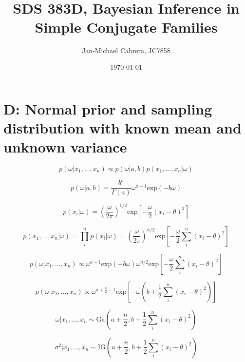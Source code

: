 \documentclass[12pt]{article}
\begin{document}
    \title{SDS 383D, Bayesian Inference in Simple Conjugate Families}
    \author{Jan-Michael Cabrera, JC7858}
    \date{\today}
    \maketitle

    \section*{D: Normal prior and sampling distribution with known mean and unknown variance}

        \begin{equation}
              p(\omega|x_1,..., x_n) \propto p(\omega|a,b)p(x_1,...,x_n|\omega)
        \end{equation}

        \begin{equation}
              p(\omega|a,b) = \frac{b^a}{\Gamma(a)} \omega^{a-1} \text{exp}(-b \omega)
        \end{equation}

        \begin{equation}
              p(x_i|\omega) = \left( \frac{\omega}{2 \pi}\right)^{1/2} \text{exp} \left [ -\frac{\omega}{2}(x_i - \theta)^2\right]
        \end{equation}

        \begin{equation}
              p(x_1,...,x_n|\omega) = \prod_i^n p(x_i|\omega) = \left( \frac{\omega}{2 \pi}\right)^{n/2} \text{exp} \left [ -\frac{\omega}{2}\sum_i^n(x_i - \theta)^2\right]
        \end{equation}

        \begin{equation}
              p(\omega|x_1,..., x_n) \propto \omega^{a-1} \text{exp}(-b \omega) \omega^{n/2} \text{exp} \left [ -\frac{\omega}{2}\sum_i^n(x_i - \theta)^2\right]
        \end{equation}

        \begin{equation}
              p(\omega|x_1,..., x_n) \propto \omega^{a + \frac{n}{2} - 1} \text{exp} \left [ -\omega \left (b+ \frac{1}{2}\sum_i^n(x_i - \theta)^2 \right )\right]
        \end{equation}

        \begin{equation}
              \omega | x_1,...,x_n \sim \text{Ga}\left (a + \frac{n}{2}, b+ \frac{1}{2}\sum_i^n(x_i - \theta)^2\right )
        \end{equation}

        \begin{equation}
              \sigma^2 | x_1,...,x_n \sim \text{IG}\left (a + \frac{n}{2}, b+ \frac{1}{2}\sum_i^n(x_i - \theta)^2\right )
        \end{equation}
\end{document}
